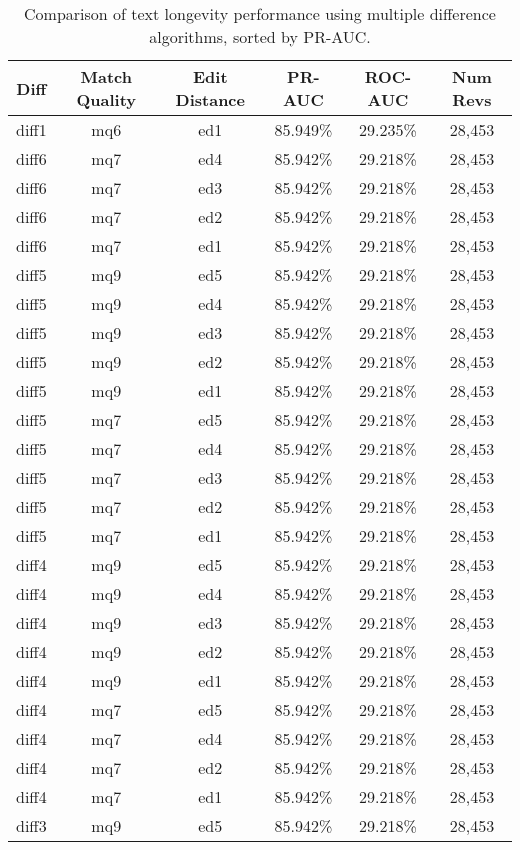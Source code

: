 \begin{table}[tbph]
\begin{center}
\begin{tabular}{|c|c|c||c|c|c|}
\hline
Diff & Match Quality & Edit Distance & PR-AUC & ROC-AUC & Num Revs \\
\hline
\hline
diff1 & mq6 & ed1 & 85.949\% & 29.235\% & 28,453 \\
diff6 & mq7 & ed4 & 85.942\% & 29.218\% & 28,453 \\
diff6 & mq7 & ed3 & 85.942\% & 29.218\% & 28,453 \\
diff6 & mq7 & ed2 & 85.942\% & 29.218\% & 28,453 \\
diff6 & mq7 & ed1 & 85.942\% & 29.218\% & 28,453 \\
diff5 & mq9 & ed5 & 85.942\% & 29.218\% & 28,453 \\
diff5 & mq9 & ed4 & 85.942\% & 29.218\% & 28,453 \\
diff5 & mq9 & ed3 & 85.942\% & 29.218\% & 28,453 \\
diff5 & mq9 & ed2 & 85.942\% & 29.218\% & 28,453 \\
diff5 & mq9 & ed1 & 85.942\% & 29.218\% & 28,453 \\
diff5 & mq7 & ed5 & 85.942\% & 29.218\% & 28,453 \\
diff5 & mq7 & ed4 & 85.942\% & 29.218\% & 28,453 \\
diff5 & mq7 & ed3 & 85.942\% & 29.218\% & 28,453 \\
diff5 & mq7 & ed2 & 85.942\% & 29.218\% & 28,453 \\
diff5 & mq7 & ed1 & 85.942\% & 29.218\% & 28,453 \\
diff4 & mq9 & ed5 & 85.942\% & 29.218\% & 28,453 \\
diff4 & mq9 & ed4 & 85.942\% & 29.218\% & 28,453 \\
diff4 & mq9 & ed3 & 85.942\% & 29.218\% & 28,453 \\
diff4 & mq9 & ed2 & 85.942\% & 29.218\% & 28,453 \\
diff4 & mq9 & ed1 & 85.942\% & 29.218\% & 28,453 \\
diff4 & mq7 & ed5 & 85.942\% & 29.218\% & 28,453 \\
diff4 & mq7 & ed4 & 85.942\% & 29.218\% & 28,453 \\
diff4 & mq7 & ed2 & 85.942\% & 29.218\% & 28,453 \\
diff4 & mq7 & ed1 & 85.942\% & 29.218\% & 28,453 \\
diff3 & mq9 & ed5 & 85.942\% & 29.218\% & 28,453 \\
\hline
\end{tabular}
\end{center}
\caption{Comparison of text longevity performance using
    multiple difference algorithms, sorted by PR-AUC.}
\label{tab:textshoutI}
\end{table}

